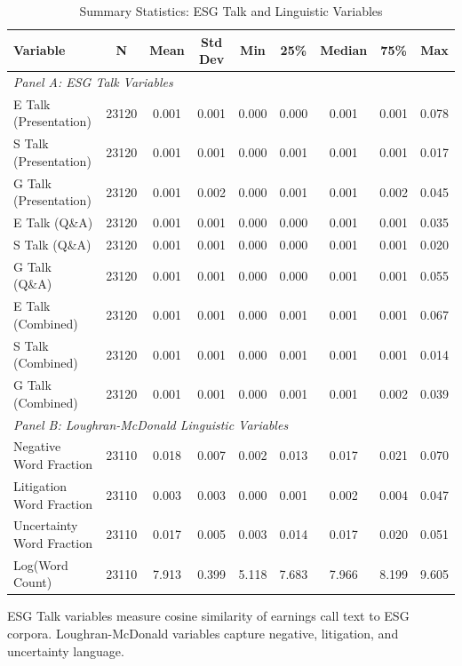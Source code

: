 \begin{table}[htbp]
\centering
\caption{Summary Statistics: ESG Talk and Linguistic Variables}
\label{tab:summary_stats}
\begin{tabular}{lcccccccc}
\hline\hline
Variable & N & Mean & Std Dev & Min & 25\% & Median & 75\% & Max \\
\hline
\multicolumn{9}{l}{\textit{Panel A: ESG Talk Variables}} \\
E Talk (Presentation) & 23120 & 0.001 & 0.001 & 0.000 & 0.000 & 0.001 & 0.001 & 0.078 \\
S Talk (Presentation) & 23120 & 0.001 & 0.001 & 0.000 & 0.001 & 0.001 & 0.001 & 0.017 \\
G Talk (Presentation) & 23120 & 0.001 & 0.002 & 0.000 & 0.001 & 0.001 & 0.002 & 0.045 \\
E Talk (Q\&A) & 23120 & 0.001 & 0.001 & 0.000 & 0.000 & 0.001 & 0.001 & 0.035 \\
S Talk (Q\&A) & 23120 & 0.001 & 0.001 & 0.000 & 0.000 & 0.001 & 0.001 & 0.020 \\
G Talk (Q\&A) & 23120 & 0.001 & 0.001 & 0.000 & 0.000 & 0.001 & 0.001 & 0.055 \\
E Talk (Combined) & 23120 & 0.001 & 0.001 & 0.000 & 0.001 & 0.001 & 0.001 & 0.067 \\
S Talk (Combined) & 23120 & 0.001 & 0.001 & 0.000 & 0.001 & 0.001 & 0.001 & 0.014 \\
G Talk (Combined) & 23120 & 0.001 & 0.001 & 0.000 & 0.001 & 0.001 & 0.002 & 0.039 \\
\hline
\multicolumn{9}{l}{\textit{Panel B: Loughran-McDonald Linguistic Variables}} \\
Negative Word Fraction & 23110 & 0.018 & 0.007 & 0.002 & 0.013 & 0.017 & 0.021 & 0.070 \\
Litigation Word Fraction & 23110 & 0.003 & 0.003 & 0.000 & 0.001 & 0.002 & 0.004 & 0.047 \\
Uncertainty Word Fraction & 23110 & 0.017 & 0.005 & 0.003 & 0.014 & 0.017 & 0.020 & 0.051 \\
Log(Word Count) & 23110 & 7.913 & 0.399 & 5.118 & 7.683 & 7.966 & 8.199 & 9.605 \\
\hline\hline
\end{tabular}
\begin{tablenotes}\small
\item ESG Talk variables measure cosine similarity of earnings call text to ESG corpora. Loughran-McDonald variables capture negative, litigation, and uncertainty language.
\end{tablenotes}
\end{table}
